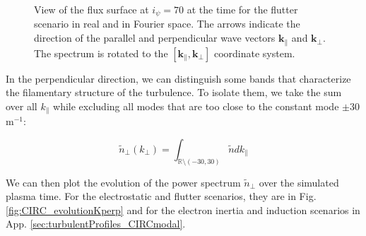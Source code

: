 \begin{figure}[H]
\begin{subfigure}[t]{0.4\textwidth}
		\label{fig:CIRC_fluxSurface_flutter_Fourier}
	\end{subfigure}
	\caption[View of the flux surface at $i_\psi=70$ at the time for the flutter scenario in real and in Fourier space]{View of the flux surface at $i_\psi=70$ at the time for the flutter scenario in real and in Fourier space. The arrows indicate the direction of the parallel and perpendicular wave vectors $\textbf{k}_\parallel$ and $\textbf{k}_\perp$. The spectrum is rotated to the $[\textbf{k}_\parallel,\textbf{k}_\perp]$ coordinate system.}
	\label{fig:CIRC_fluxSurface_flutter}
\end{figure}

In the perpendicular direction, we can distinguish some bands that characterize the filamentary structure of the turbulence. To isolate them, we take the sum over all $k_\parallel$ while excluding all modes that are too close to the constant mode $\pm30$m$^{-1}$:

\begin{equation}
	\tilde{n}_\perp(k_\perp) = \int_{\mathbb{R}\setminus (-30, 30)}\tilde{n}dk_\parallel
\end{equation}

We can then plot the evolution of the power spectrum $\tilde{n}_\perp$ over the simulated plasma time. For the electrostatic and flutter scenarios, they are in Fig. \ref{fig:CIRC_evolutionKperp} and for the electron inertia and induction scenarios in App. \ref{sec:turbulentProfiles_CIRCmodal}.

